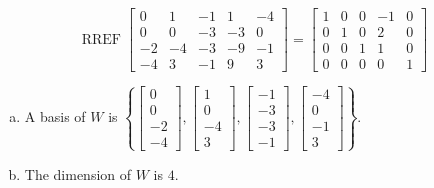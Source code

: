 \begin{exerciseAnswer} 


\[\operatorname{RREF} \left[\begin{array}{ccccc}
0 & 1 & -1 & 1 & -4 \\
0 & 0 & -3 & -3 & 0 \\
-2 & -4 & -3 & -9 & -1 \\
-4 & 3 & -1 & 9 & 3
\end{array}\right] = \left[\begin{array}{ccccc}
1 & 0 & 0 & -1 & 0 \\
0 & 1 & 0 & 2 & 0 \\
0 & 0 & 1 & 1 & 0 \\
0 & 0 & 0 & 0 & 1
\end{array}\right] \]


\begin{enumerate}[(a)]
\item A basis of \(W\) is \( \left\{ \left[\begin{array}{c}
0 \\
0 \\
-2 \\
-4
\end{array}\right] , \left[\begin{array}{c}
1 \\
0 \\
-4 \\
3
\end{array}\right] , \left[\begin{array}{c}
-1 \\
-3 \\
-3 \\
-1
\end{array}\right] , \left[\begin{array}{c}
-4 \\
0 \\
-1 \\
3
\end{array}\right] \right\} \).
\item The dimension of \(W\) is \( 4 \).
\end{enumerate}
    
\end{exerciseAnswer}
    
